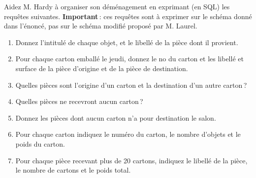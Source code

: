 Aidez M. Hardy à organiser son déménagement en
exprimant (en SQL) les requêtes suivantes. \textbf{Important}\,: ces requêtes sont à exprimer
sur le schéma donné dans l'énoncé, pas sur le schéma modifié proposé par M. Laurel.

\begin{enumerate}
  \item Donnez l'intitulé de chaque objet, et le libellé de la pièce 
    dont il provient.
    
  \item Pour chaque carton emballé le jeudi, donnez le no du carton et les libellé et surface
      de la pièce d'origine et de la pièce de destination.
  \item Quelles pièces sont l'origine d'un carton et la destination d'un autre carton\,?
  \item Quelles pièces ne recevront aucun carton\,?
  \item Donnez les pièces dont aucun carton n'a pour destination le salon.
  \item Pour chaque carton indiquez le numéro du carton, le nombre d'objets et le poids du carton.
  \item Pour chaque pièce recevant plus de 20 cartons, indiquez le libellé de la pièce, le
    nombre de cartons et le poids total.
  \end{enumerate}


